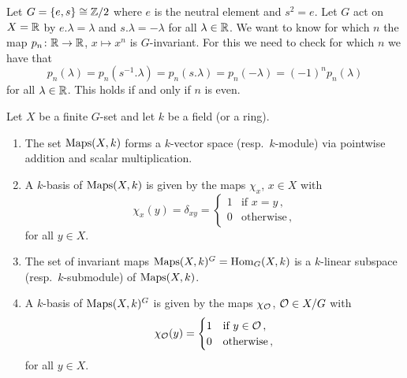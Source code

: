 \begin{expl}
  Let $G = \{e,s\} \cong \mathbb{Z}/2$ where $e$ is the neutral element and $s^2 = e$.
  Let $G$ act on $X = \mathbb{R}$ by $e.\lambda = \lambda$ and $s.\lambda = -\lambda$ for all $\lambda \in \mathbb{R}$.
  We want to know for which $n$ the map $p_n \colon \mathbb{R} \to \mathbb{R}$, $x \mapsto x^n$ is $G$-invariant.
  For this we need to check for which $n$ we have that
  \[
      p_n(\lambda)
    = p_n\left( s^{-1}.\lambda \right)
    = p_n(s.\lambda)
    = p_n(-\lambda)
    = (-1)^n p_n(\lambda)
  \]
  for all $\lambda \in \mathbb{R}$.
  This holds if and only if $n$ is even.
\end{expl}


\begin{lemma}\label{lemma: basis of Maps and Hom}
  Let $X$ be a finite $G$-set and let $k$ be a field \textup(or a ring\textup).
  \begin{enumerate}[label=\alph*),leftmargin=*]
    \item
      The set $\operatorname{Maps}(X,k)$ forms a $k$-vector space \textup(resp.\ $k$-module\textup) via pointwise addition and scalar multiplication.
    \item
      A $k$-basis of $\operatorname{Maps}(X,k)$ is given by the maps $\chi_x$, $x \in X$ with
      \[
          \chi_x(y)
        = \delta_{xy}
        = \begin{cases}
            1 & \text{if $x = y$} \,, \\
            0 & \text{otherwise}  \,,
          \end{cases}
      \]
      for all $y \in X$.
    \item
      The set of invariant maps $\operatorname{Maps}(X,k)^G = \operatorname{Hom}_G(X,k)$ is a $k$-linear subspace \textup(resp.\ $k$-submodule\textup) of $\operatorname{Maps}(X,k)$.
    \item
      A $k$-basis of $\operatorname{Maps}(X,k)^G$ is given by the maps $\chi_\mathcal{O}$, $\mathcal{O} \in X/G$ with
      \[
          \chi_\mathcal{O}(y)
        = \begin{cases}
            1 & \text{if $y \in \mathcal{O}$} \,,  \\
            0 & \text{otherwise} \,,
          \end{cases}
      \]
      for all $y \in X$.
  \end{enumerate}
\end{lemma}
